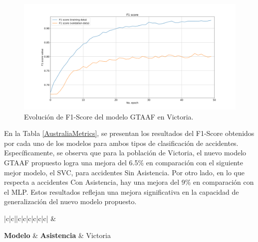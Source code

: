\documentclass{uathesis-es}
\begin{document}
{		\begin{figure}[h]
			\centering
			\includegraphics[width=160mm]{Figures/Victoria/Victoria_convolution_2d_f1_score_paper.png}
			\caption{Evolución de F1-Score del modelo GTAAF en Victoria.}
			\label{VictoriaLossFunction}
		\end{figure}
		
		En la Tabla \ref{AustraliaMetrics}, se presentan los resultados del F1-Score obtenidos por cada uno de los modelos para ambos tipos de clasificación de accidentes. Específicamente, se observa que para la población de Victoria, el nuevo modelo GTAAF propuesto logra una mejora del 6.5\% en comparación con el siguiente mejor modelo, el SVC, para accidentes Sin Asistencia. Por otro lado, en lo que respecta a accidentes Con Asistencia, hay una mejora del 9\% en comparación con el MLP. Estos resultados reflejan una mejora significativa en la capacidad de generalización del nuevo modelo propuesto.
		
		
		\begin{table}[H]
			\begin{center}
				\begin{tabular}{|c|c||c|c|c|c|c|c|}
					\hline
					 &
					 \\ \hline
					
					\textbf{Modelo} & \textbf{Asistencia} & Victoria
					\\ \hline \hline
					

\end{tabular}
\end{center}
\end{table}}
\end{document}
